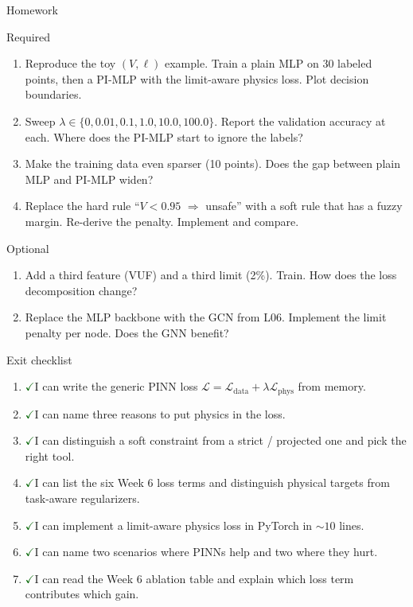 \documentclass[aspectratio=169,10pt]{beamer}
\newcommand{\checkitem}{\textcolor{darkgreen}{\Large$\checkmark$}\;}
\begin{document}
\begin{frame}{Homework}
\begin{block}{Required}
\begin{enumerate}
  \item Reproduce the toy $(V, \ell)$ example. Train a plain MLP on 30 labeled points, then a PI-MLP with the limit-aware physics loss. Plot decision boundaries.
  \item Sweep $\lambda \in \{0, 0.01, 0.1, 1.0, 10.0, 100.0\}$. Report the validation accuracy at each. Where does the PI-MLP start to ignore the labels?
  \item Make the training data even sparser (10 points). Does the gap between plain MLP and PI-MLP widen?
  \item Replace the hard rule ``$V < 0.95$ $\Rightarrow$ unsafe'' with a soft rule that has a fuzzy margin. Re-derive the penalty. Implement and compare.
\end{enumerate}
\end{block}
\begin{block}{Optional}
\begin{enumerate}
  \item Add a third feature (VUF) and a third limit (2\%). Train. How does the loss decomposition change?
  \item Replace the MLP backbone with the GCN from L06. Implement the limit penalty per node. Does the GNN benefit?
\end{enumerate}
\end{block}
\end{frame}

\begin{frame}{Exit checklist}
\begin{enumerate}
  \item \checkitem I can write the generic PINN loss $\mathcal{L} = \mathcal{L}_{\text{data}} + \lambda \mathcal{L}_{\text{phys}}$ from memory.
  \item \checkitem I can name three reasons to put physics in the loss.
  \item \checkitem I can distinguish a soft constraint from a strict / projected one and pick the right tool.
  \item \checkitem I can list the six Week 6 loss terms and distinguish physical targets from task-aware regularizers.
  \item \checkitem I can implement a limit-aware physics loss in PyTorch in $\sim 10$ lines.
  \item \checkitem I can name two scenarios where PINNs help and two where they hurt.
  \item \checkitem I can read the Week 6 ablation table and explain which loss term contributes which gain.
\end{enumerate}
\end{frame}
\end{document}
